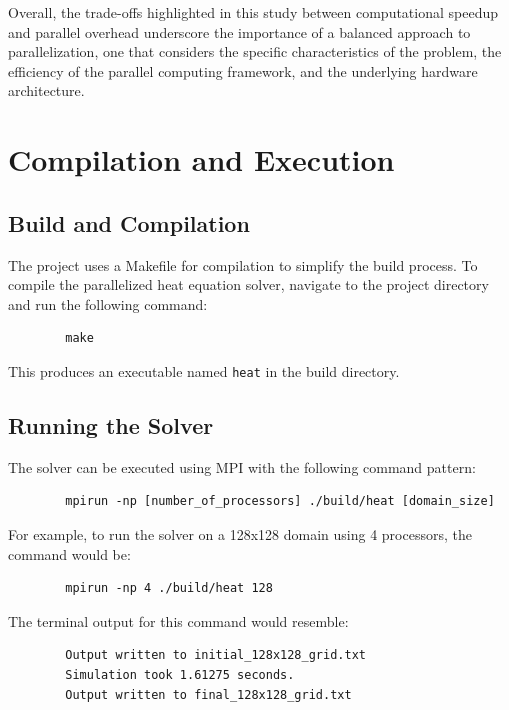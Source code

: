 \documentclass[11pt]{article}
\begin{document}
    Overall, the trade-offs highlighted in this study between computational speedup and parallel overhead underscore the importance of a balanced approach to parallelization, one that considers the specific characteristics of the problem, the efficiency of the parallel computing framework, and the underlying hardware architecture.

    \section{Compilation and Execution}
        \subsection{Build and Compilation}
        The project uses a Makefile for compilation to simplify the build process. To compile the parallelized heat equation solver, navigate to the project directory and run the following command:
        
        \begin{verbatim}
        make
        \end{verbatim}

        This produces an executable named \texttt{heat} in the build directory.

        \subsection{Running the Solver}
        The solver can be executed using MPI with the following command pattern:
        
        \begin{verbatim}
        mpirun -np [number_of_processors] ./build/heat [domain_size]
        \end{verbatim}

        For example, to run the solver on a 128x128 domain using 4 processors, the command would be:
        
        \begin{verbatim}
        mpirun -np 4 ./build/heat 128
        \end{verbatim}

        The terminal output for this command would resemble:
        
        \begin{verbatim}
        Output written to initial_128x128_grid.txt
        Simulation took 1.61275 seconds.
        Output written to final_128x128_grid.txt
        \end{verbatim}
\end{document}
